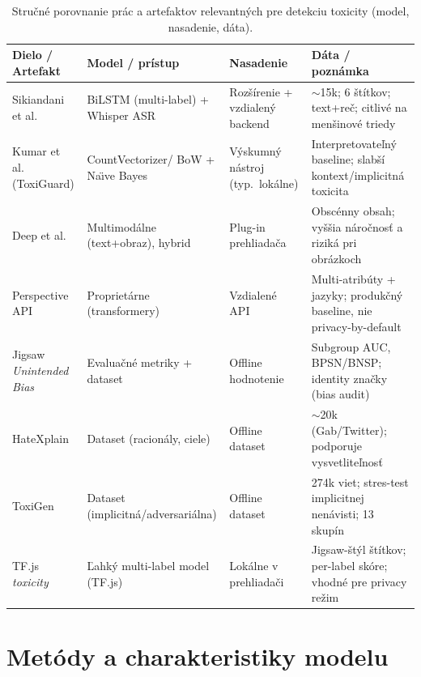 \FloatBarrier
\begin{table}[!htbp]
  \centering
  \small
  \begin{tabularx}{\textwidth}{|Y|Y|Y|Y|}
    \hline
    \textbf{Dielo / Artefakt} & \textbf{Model / prístup} & \textbf{Nasadenie} & \textbf{Dáta / poznámka} \\
    \hline
    Sikiandani et al. & BiLSTM (multi-label) + Whisper ASR & Rozšírenie + vzdialený backend & $\sim$15k; 6 štítkov; text+reč; citlivé na menšinové triedy \\
    \hline
    Kumar et al. (ToxiGuard) & CountVectorizer/ BoW + Na\"{\i}ve Bayes & Výskumný nástroj (typ.\ lokálne) & Interpretovateľný baseline; slabší kontext/implicitná toxicita \\
    \hline
    Deep et al. & Multimodálne (text+obraz), hybrid & Plug-in prehliadača & Obscénny obsah; vyššia náročnosť a riziká pri obrázkoch \\
    \hline
    Perspective API & Proprietárne (transformery) & Vzdialené API & Multi-atribúty + jazyky; produkčný baseline, nie privacy-by-default \\
    \hline
    Jigsaw \textit{Unintended Bias} & Evaluačné metriky + dataset & Offline hodnotenie & Subgroup AUC, BPSN/BNSP; identity značky (bias audit) \\
    \hline
    HateXplain & Dataset (racionály, ciele) & Offline dataset & $\sim$20k (Gab/Twitter); podporuje vysvetliteľnosť \\
    \hline
    ToxiGen & Dataset (implicitná/adversariálna) & Offline dataset & 274k viet; stres-test implicitnej nenávisti; 13 skupín \\
    \hline
    TF.js \textit{toxicity} & Ľahký multi-label model (TF.js) & Lokálne v prehliadači & Jigsaw-štýl štítkov; per-label skóre; vhodné pre privacy režim \\
    \hline
  \end{tabularx}
  \caption[Porovnanie prác a artefaktov]{Stručné porovnanie prác a artefaktov relevantných pre detekciu toxicity (model, nasadenie, dáta).}
  \label{tab:review_comparison_short}
\end{table}
\FloatBarrier

\section{Metódy a charakteristiky modelu}
